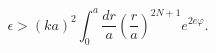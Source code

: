 \begin{equation}
\label{Eq_0314}
\epsilon > (ka)^2 \int^a_0 \frac{dr}{a}
  \left(\frac{r}{a}\right)^{2N+1} e^{2e \varphi}.
\end{equation}

